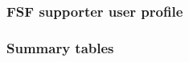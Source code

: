 \documentclass[10pt,a4paper]{article}
\begin{document}
    \subsubsection{FSF supporter user profile}

    
    \subsubsection{Summary tables}
    
        
    
    



\end{document}
